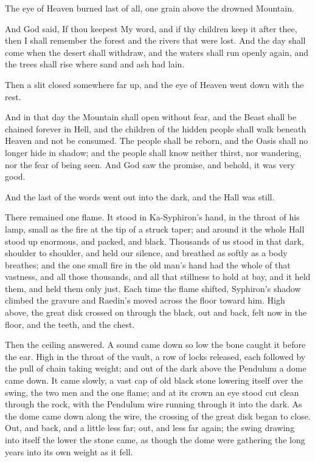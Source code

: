 The eye of Heaven burned last of all, one grain above the drowned Mountain.\par

\begin{scripture}
And God said, If thou keepest My word, and if thy children keep it after thee, then I shall remember the forest and the rivers that were lost. And the day shall come when the desert shall withdraw, and the waters shall run openly again, and the trees shall rise where sand and ash had lain.
\end{scripture}

Then a slit closed somewhere far up, and the eye of Heaven went down with the rest.\par

\begin{scripture}
And in that day the Mountain shall open without fear, and the Beast shall be chained forever in Hell, and the children of the hidden people shall walk beneath Heaven and not be consumed. The people shall be reborn, and the Oasis shall no longer hide in shadow; and the people shall know neither thirst, nor wandering, nor the fear of being seen. And God saw the promise, and behold, it was very good.
\end{scripture}

And the last of the words went out into the dark, and the Hall was still.\par

There remained one flame. It stood in Ka-Syphiron's hand, in the throat of his lamp, small as the fire at the tip of a struck taper; and around it the whole Hall stood up enormous, and packed, and black. Thousands of us stood in that dark, shoulder to shoulder, and held our silence, and breathed as softly as a body breathes; and the one small fire in the old man's hand had the whole of that vastness, and all those thousands, and all that stillness to hold at bay, and it held them, and held them only just. Each time the flame shifted, Syphiron's shadow climbed the gravure and Raedin's moved across the floor toward him. High above, the great disk crossed on through the black, out and back, felt now in the floor, and the teeth, and the chest.\par

\ornament

Then the ceiling answered. A sound came down so low the bone caught it before the ear. High in the throat of the vault, a row of locks released, each followed by the pull of chain taking weight; and out of the dark above the Pendulum a dome came down. It came slowly, a vast cap of old black stone lowering itself over the swing, the two men and the one flame; and at its crown an eye stood cut clean through the rock, with the Pendulum wire running through it into the dark. As the dome came down along the wire, the crossing of the great disk began to close. Out, and back, and a little less far; out, and less far again; the swing drawing into itself the lower the stone came, as though the dome were gathering the long years into its own weight as it fell.\par


